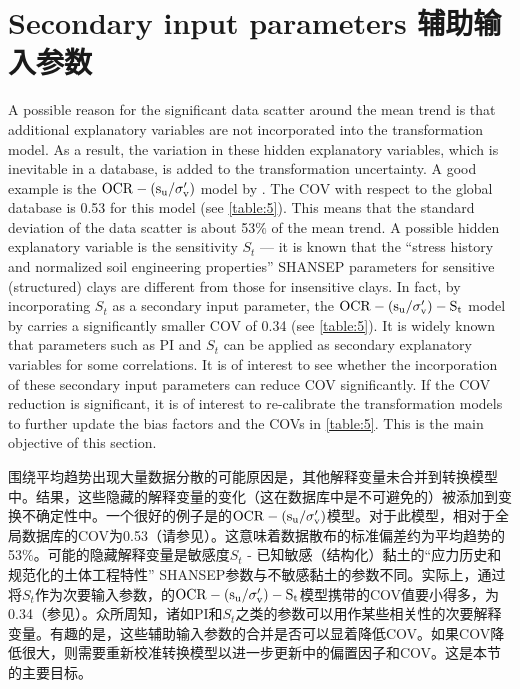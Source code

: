 \section{Secondary input parameters 辅助输入参数}

\begin{paracol}{2}

    A possible reason for the significant data scatter around the mean trend is that additional explanatory variables are not incorporated into the transformation model. As a result, the variation in these hidden explanatory variables, which is inevitable in a database, is added to the transformation uncertainty. A good example is the $\rm{OCR}-(s_u/\sigma_v')$ model by \citet{Jamiolkowski198557}. The COV with respect to the global database is 0.53 for this model (see \autoref{table:5}). This means that the standard deviation of the data scatter is about 53$\%$ of the mean trend. A possible hidden explanatory variable is the sensitivity $S_t$ — it is known that the “stress history and normalized soil engineering properties” SHANSEP parameters for sensitive (structured) clays are different from those for insensitive clays. In fact, by incorporating $S_t$ as a secondary input parameter, the $\rm{OCR}-(s_u/\sigma_v')-S_t$ model by \cite{Ching2012522}carries a significantly smaller COV of 0.34 (see \autoref{table:5}). It is widely known that parameters such as PI and $S_t$ can be applied as secondary explanatory variables for some correlations. It is of interest to see whether the incorporation of these secondary input parameters can reduce COV significantly. If the COV reduction is significant, it is of interest to re-calibrate the transformation models to further update the bias factors and the COVs in \autoref{table:5}. This is the main objective of this section.

    \switchcolumn

    围绕平均趋势出现大量数据分散的可能原因是，其他解释变量未合并到转换模型中。结果，这些隐藏的解释变量的变化（这在数据库中是不可避免的）被添加到变换不确定性中。一个很好的例子是\citet{Jamiolkowski198557}的$\rm{OCR}-(s_u/\sigma_v')$模型。对于此模型，相对于全局数据库的COV为0.53（请参见）。这意味着数据散布的标准偏差约为平均趋势的53$\%$。可能的隐藏解释变量是敏感度$S_t$ - 已知敏感（结构化）黏土的“应力历史和规范化的土体工程特性” SHANSEP参数与不敏感黏土的参数不同。实际上，通过将$S_t$作为次要输入参数，\cite{Ching2012522}的$\rm{OCR}-(s_u/\sigma_v')-S_t$模型携带的COV值要小得多，为0.34（参见）。众所周知，诸如PI和$S_t$之类的参数可以用作某些相关性的次要解释变量。有趣的是，这些辅助输入参数的合并是否可以显着降低COV。如果COV降低很大，则需要重新校准转换模型以进一步更新中的偏置因子和COV。这是本节的主要目标。


\end{paracol}
